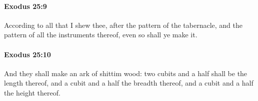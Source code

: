 		\paragraph{Exodus 25:9} %
			\label{EXODUS-25-9}

			According to all that I shew thee, after the pattern of the tabernacle, and the pattern of all the instruments thereof, even so shall ye make it.


		\paragraph{Exodus 25:10} %
			\label{EXODUS-25-10}

			And they shall make an ark of shittim wood: two cubits and a half shall be the length thereof, and a cubit and a half the breadth thereof, and a cubit and a half the height thereof.


